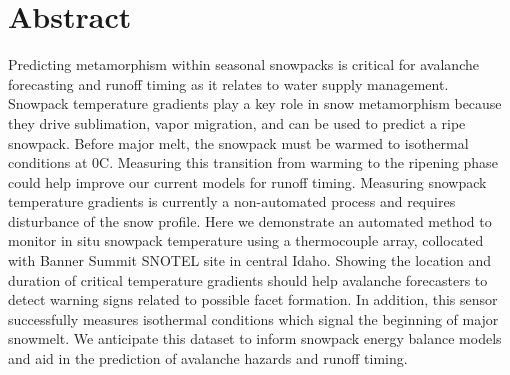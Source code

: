 \chapter*{Abstract}

Predicting metamorphism within seasonal snowpacks is critical for avalanche forecasting and runoff timing as it relates to water supply management. Snowpack temperature gradients play a key role in snow metamorphism because they drive sublimation, vapor migration, and can be used to predict a ripe snowpack. Before major melt, the snowpack must be warmed to isothermal conditions at 0\textdegree C. Measuring this transition from warming to the ripening phase could help improve our current models for runoff timing. Measuring snowpack temperature gradients is currently a non-automated process and requires disturbance of the snow profile. Here we demonstrate an automated method to monitor in situ snowpack temperature using a thermocouple array, collocated with Banner Summit SNOTEL site in central Idaho. Showing the location and duration of critical temperature gradients should help avalanche forecasters to detect warning signs related to possible facet formation. In addition, this sensor successfully measures isothermal conditions which signal the beginning of major snowmelt. We anticipate this dataset to inform snowpack energy balance models and aid in the prediction of avalanche hazards and runoff timing.
